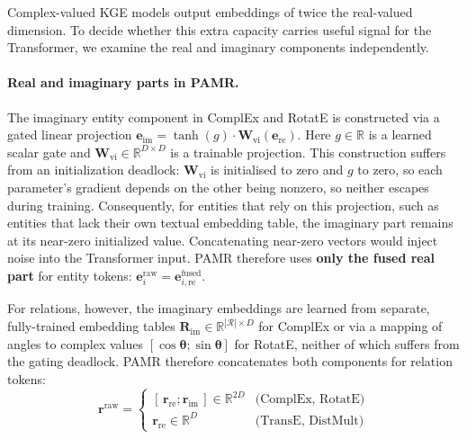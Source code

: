 Complex-valued KGE models output embeddings of twice the real-valued dimension.
To decide whether this extra capacity carries useful signal for the Transformer, we
examine the real and imaginary components independently.

\vspace{-1em}
\paragraph{Real and imaginary parts in PAMR.}
The imaginary entity component in ComplEx and RotatE is constructed via a gated linear projection
$\mathbf{e}_{\text{im}} = \tanh(g) \cdot \mathbf{W}_{\text{vi}}(\mathbf{e}_{\text{re}})$.
Here $g \in \mathbb{R}$ is a learned scalar gate and $\mathbf{W}_{\text{vi}} \in \mathbb{R}^{D \times D}$
is a trainable projection.  This construction suffers from an initialization deadlock:
$\mathbf{W}_{\text{vi}}$ is initialised to zero and $g$ to zero, so each parameter's gradient
depends on the other being nonzero, so neither escapes during training.  Consequently, for
entities that rely on this projection, such as entities that lack their own textual embedding table,
the imaginary part remains at its near-zero initialized value.  Concatenating near-zero
vectors would inject noise into the Transformer input.  PAMR therefore uses \textbf{only the
fused real part} for entity tokens: $\mathbf{e}^{\text{raw}}_i = \mathbf{e}^{\text{fused}}_{i,\text{re}}$.

For relations, however, the imaginary embeddings are learned from separate, fully-trained
embedding tables $\mathbf{R}_{\text{im}} \in \mathbb{R}^{|\mathcal{R}| \times D}$ for ComplEx
or via a mapping of angles to complex values $[\cos\boldsymbol{\theta}; \sin\boldsymbol{\theta}]$ for RotatE,
neither of which suffers from the gating deadlock.  PAMR therefore concatenates both components
for relation tokens:
\begin{equation}
\mathbf{r}^{\text{raw}} = \begin{cases}
    [\,\mathbf{r}_{\text{re}}; \mathbf{r}_{\text{im}}\,] \in \mathbb{R}^{2D}
        & \text{(ComplEx, RotatE)} \\
    \mathbf{r}_{\text{re}} \in \mathbb{R}^{D}
        & \text{(TransE, DistMult)}
\end{cases}
\label{eq:rel-raw}
\end{equation}

\vspace{-1em}
